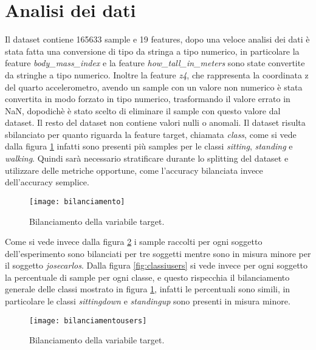 \section{Analisi dei dati}\label{sec:analisi}

Il dataset \cite{dataset_article} contiene 165633 sample e 19 features, dopo una veloce analisi dei dati è stata fatta una conversione di tipo da stringa a tipo numerico, in particolare la feature \textit{body\_mass\_index} e la feature \textit{how\_tall\_in\_meters} sono state convertite da stringhe a tipo numerico. Inoltre la feature \textit{z4}, che rappresenta la coordinata z del quarto accelerometro, avendo un sample con un valore non numerico è stata convertita in modo forzato in tipo numerico, trasformando il valore errato in NaN, dopodichè è stato scelto di eliminare il sample con questo valore dal dataset.  Il resto del dataset non contiene valori nulli o anomali.
Il dataset risulta sbilanciato per quanto riguarda la feature target, chiamata \textit{class}, come si vede dalla figura \ref{fig:bilanciamento} infatti sono presenti più samples per le classi \textit{sitting}, \textit{standing} e \textit{walking}. Quindi sarà necessario stratificare durante lo splitting del dataset e utilizzare delle metriche opportune, come l'accuracy bilanciata invece dell'accuracy semplice.

\begin{figure}[h]
    \centering\texttt{[image: bilanciamento]}
    \caption{Bilanciamento della variabile target.}
    \label{fig:bilanciamento}
\end{figure}

Come si vede invece dalla figura \ref{fig:bilanciamentousers} i sample raccolti per ogni soggetto dell'esperimento sono bilanciati per tre soggetti mentre sono in misura minore per il soggetto \textit{josecarlos}. Dalla figura \ref{fig:classiusers} si vede invece per ogni soggetto la percentuale di sample per ogni classe, e questo rispecchia il bilanciamento generale delle classi mostrato in figura \ref{fig:bilanciamento}, infatti le percentuali sono simili, in particolare le classi \textit{sittingdown} e \textit{standingup} sono presenti in misura minore.

\begin{figure}[h]
    \centering\texttt{[image: bilanciamentousers]}
    \caption{Bilanciamento della variabile target.}
    \label{fig:bilanciamentousers}
\end{figure}


